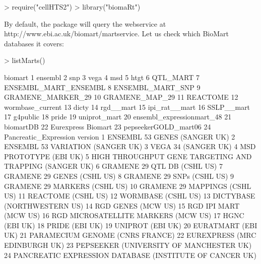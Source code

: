 \begin{Schunk}
\begin{Sinput}
> require("cellHTS2")
> library("biomaRt")
\end{Sinput}
\end{Schunk}
%
By default, the  package will query the webservice at\newline 
http://www.ebi.ac.uk/biomart/martservice.  Let us check
which BioMart databases it covers:
%
\begin{Schunk}
\begin{Sinput}
> listMarts()
\end{Sinput}
\begin{Soutput}
                     biomart
1                    ensembl
2                        snp
3                       vega
4                        msd
5                       htgt
6                   QTL_MART
7       ENSEMBL_MART_ENSEMBL
8           ENSEMBL_MART_SNP
9          GRAMENE_MARKER_29
10            GRAMENE_MAP_29
11                  REACTOME
12          wormbase_current
13                     dicty
14                 rgd__mart
15             ipi_rat__mart
16                SSLP__mart
17                  g4public
18                     pride
19              uniprot_mart
20 ensembl_expressionmart_48
21                 biomartDB
22        Eurexpress Biomart
23      pepseekerGOLD_mart06
24     Pancreatic_Expression
                                                   version
1                             ENSEMBL 53 GENES (SANGER UK)
2                        ENSEMBL 53 VARIATION  (SANGER UK)
3                                     VEGA 34  (SANGER UK)
4                                   MSD PROTOTYPE (EBI UK)
5  HIGH THROUGHPUT GENE TARGETING AND TRAPPING (SANGER UK)
6                              GRAMENE 29 QTL DB (CSHL US)
7                               GRAMENE 29 GENES (CSHL US)
8                                GRAMENE 29 SNPs (CSHL US)
9                             GRAMENE 29 MARKERS (CSHL US)
10                           GRAMENE 29 MAPPINGS (CSHL US)
11                                      REACTOME (CSHL US)
12                                      WORMBASE (CSHL US)
13                             DICTYBASE (NORTHWESTERN US)
14                                      RGD GENES (MCW US)
15                                   RGD IPI MART (MCW US)
16                     RGD MICROSATELLITE MARKERS (MCW US)
17                                           HGNC (EBI UK)
18                                          PRIDE (EBI UK)
19                                        UNIPROT (EBI UK)
20                                      EURATMART (EBI UK)
21                         PARAMECIUM GENOME (CNRS FRANCE)
22                           EUREXPRESS (MRC EDINBURGH UK)
23                 PEPSEEKER (UNIVERSITY OF MANCHESTER UK)
24 PANCREATIC EXPRESSION DATABASE (INSTITUTE OF CANCER UK)
\end{Soutput}
\end{Schunk}
